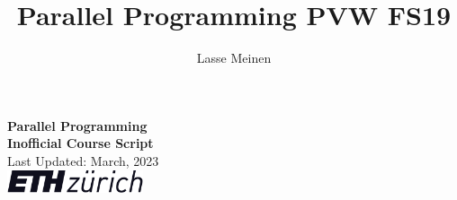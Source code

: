 \documentclass[titlepage, dvipsnames]{article}
\title{Parallel Programming PVW FS19}
\author{Lasse Meinen}
\theoremstyle{plain}
\theoremstyle{remark}
\theoremstyle{definition}
\begin{document}
    \renewcommand{\figurename}{Fig.}
    \renewcommand{\contentsname}{Table of Contents}
    \renewcommand{\thesubfigure}{\roman{subfigure}}

    \renewcommand{\ExerciseHeaderTitle}{\ExerciseTitle}
    \renewcommand{\ExerciseHeader}{\centerline{\textbf{\large\ExerciseName\ExerciseHeaderNB\ExerciseHeaderTitle\ExerciseHeaderOrigin}}\\}
    \renewcommand{\ExerciseListHeader}{\ExerciseHeaderDifficulty%
    \textbf{\ExerciseHeaderNB .%
    \ \ExerciseHeaderTitle \newline}%
    \ExerciseHeaderOrigin\ignorespaces}
    \renewcommand{\AnswerListHeader}{\textbf{\ExerciseHeaderNB. \ \ExerciseHeaderTitle}}
    \setlength{\Exesep}{1\baselineskip}
    \setlength{\QuestionBefore}{.2em}
    \setlength{\QuestionIndent}{2em}

    \makeatletter
        \begin{titlepage}
		\begin{center}
		\huge \textbf{Parallel Programming \\ Inofficial Course Script}
		\\ \bigskip
		\Large Last Updated: March, 2023
		\\ \bigskip
		\vfill
		{\includegraphics[width = 0.3\textwidth]{images/ETH.png}}
		\vfill
		\end{center}

	\end{titlepage}
    \makeatother
    \thispagestyle{empty}
    \newpage

    \setcounter{page}{1} %

    \tableofcontents
    \newpage
    
    \newpage
    
    \newpage
    
    \newpage
    
\end{document}
